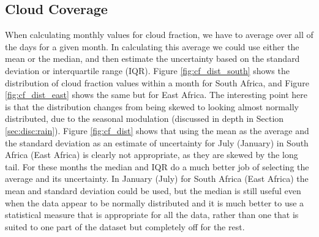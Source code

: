 \subsection{Cloud Coverage}
\label{sec:disc:cc}
When calculating monthly values for cloud fraction, we have to average
over all of the days for a given month. In calculating this average we
could use either the mean or the median, and then estimate the
uncertainty based on the standard deviation or interquartile range
(IQR). Figure \ref{fig:cf_dist_south} shows the distribution of cloud
fraction values within a month for South Africa, and Figure
\ref{fig:cf_dist_east} shows the same but for East Africa. The
interesting point here is that the distribution changes from being
skewed to looking almost normally distributed, due to the seasonal
modulation (discussed in depth in Section \ref{sec:disc:rain}). Figure
\ref{fig:cf_dist} shows that using the mean as the average and the
standard deviation as an estimate of uncertainty for July (January) in
South Africa (East Africa) is clearly not appropriate, as they are
skewed by the long tail. For these months the median and IQR do a much
better job of selecting the average and its uncertainty. In January
(July) for South Africa (East Africa) the mean and standard deviation
could be used, but the median is still useful even when the data
appear to be normally distributed and it is much better to use a
statistical measure that is appropriate for all the data, rather than
one that is suited to one part of the dataset but completely off for
the rest.
